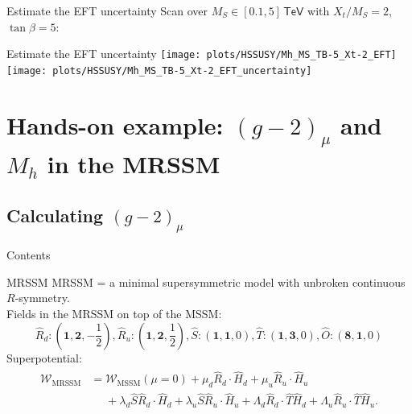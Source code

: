 \documentclass[hyperref={pdfpagelabels=false},ngerman]{beamer}
\newcommand{\eh}[1]{\,\mathsf{#1}}
\newcommand{\MS}{\ensuremath{M_S}}
\begin{document}
\begin{frame}{Estimate the EFT uncertainty}
  Scan over $\MS \in [0.1, 5]\eh{TeV}$ with $X_t/\MS = 2$, $\tan\beta = 5$:\\[2em]
  \usebox{\listbox}
\end{frame}

\begin{frame}{Estimate the EFT uncertainty}
  \texttt{[image: plots/HSSUSY/Mh\_MS\_TB-5\_Xt-2\_EFT]}\hfill
  \texttt{[image: plots/HSSUSY/Mh\_MS\_TB-5\_Xt-2\_EFT\_uncertainty]}
\end{frame}

\section{Hands-on example: $(g-2)_\mu$ and $M_h$ in the MRSSM}
\subsection{Calculating $(g-2)_\mu$}

\begin{frame}{Contents}
  \tableofcontents[currentsubsection,sectionstyle=show/shaded]  
\end{frame}

\begin{frame}{MRSSM}
  MRSSM = a minimal supersymmetric model with unbroken continuous
  $R$-symmetry.
  \\[1em]
  Fields in the MRSSM on top of the MSSM:
\begin{equation*}
 \hat{R}_d:\textstyle (\mathbf{1} ,\mathbf{2},-\frac{1}{2}) ,
 \hat{R}_u:\textstyle (\mathbf{1} ,\mathbf{2}, \frac{1}{2}) ,
 \hat{S}:\textstyle (\mathbf{1} ,\mathbf{1}, 0) ,
 \hat{T}:\textstyle (\mathbf{1} ,\mathbf{3}, 0) ,
 \hat{O}:\textstyle (\mathbf{8} ,\mathbf{1}, 0)
\end{equation*}
%
Superpotential:
%
\begin{align*}
  \begin{split}
    \mathcal{W}_{\text{MRSSM}} &= \mathcal{W}_{\text{MSSM}}(\mu = 0)
    + \mu_d \hat{R}_d \cdot \hat{H}_d + \mu_u \hat{R}_u\cdot\hat{H}_u \\
    &\phantom{={}}+ \lambda_d \hat{S} \hat{R}_d \cdot \hat{H}_d +
    \lambda_u \hat{S} \hat{R}_u\cdot\hat{H}_u +\Lambda_d
    \hat{R}_d\cdot \hat{T} \hat{H}_d +\Lambda_u \hat{R}_u\cdot\hat{T}
    \hat{H}_u .
  \end{split}
\end{align*}
\end{frame}
\end{document}
